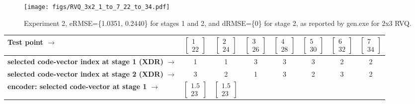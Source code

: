 							\begin{figure}[h]
							\centering
							\texttt{[image: figs/RVQ\_3x2\_1\_to\_7\_22\_to\_34.pdf]}
							\caption{Experiment 2, eRMSE=\{1.0351, 0.2440\} for stages 1 and 2, and dRMSE=\{0\} for stage 2, as reported by gen.exe for 2x3 RVQ.}
							\label{fig:RVQ_3x2_1_to_7_22_to_34}
							\end{figure}

\begin{table}[t]
\tiny
\centering
\begin{tabular}{|l||c|c|c|c|c|c|c|}\hline 
\textbf{Test point} $\rightarrow$                             			& 
$\left[\begin{array}{c}1 \\22\end{array}\right]$  				&
$\left[\begin{array}{c}2 \\24\end{array}\right]$ 					&
$\left[\begin{array}{c}3 \\26\end{array}\right]$   				&
$\left[\begin{array}{c}4 \\28\end{array}\right]$   				&
$\left[\begin{array}{c}5 \\30\end{array}\right]$ 					&
$\left[\begin{array}{c}6 \\32\end{array}\right]$ 					&
$\left[\begin{array}{c}7 \\34\end{array}\right]$ \\\hline\hline
\textbf{selected code-vector index at stage 1 (XDR)} $\rightarrow$ & 1     &  1   &  3   &  3   &  3   &  2     & 2 \\
\textbf{selected code-vector index at stage 2 (XDR)} $\rightarrow$ & 3     & 2     & 1   &  3   &  2   &  3     & 2 \\
\hline
\textbf{encoder: selected code-vector at stage 1} $\rightarrow$ & 
$\left[\begin{array}{c}1.5 \\23\end{array}\right]$     			&  
$\left[\begin{array}{c}1.5 \\23\end{array}\right]$				&  

\end{tabular}
\end{table}
